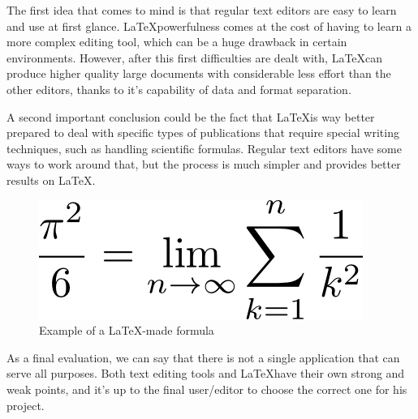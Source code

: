 The first idea that comes to mind is that regular text editors are easy to learn and use at first glance. \LaTeX powerfulness comes at the cost of having to learn a more complex editing tool, which can be a huge drawback in certain environments. However, after this first difficulties are dealt with, \LaTeX can produce higher quality large documents with considerable less effort than the other editors, thanks to it's capability of data and format separation.

A second important conclusion could be the fact that \LaTeX is way better prepared to deal with specific types of publications that require special writing techniques, such as handling scientific formulas. Regular text editors have some ways to work around that, but the process is much simpler and provides better results on \LaTeX.

\begin{figure}[H]
  \centering
  \includegraphics[scale=0.5]{Chapters/LaTeXFormulaEffect.png}
  \caption{ Example of a \LaTeX-made formula\footnotemark}
  \label{fig:LaTeX-formula-example}
\end{figure}


As a final evaluation, we can say that there is not a single application that can serve all purposes. Both text editing tools and \LaTeX have their own strong and weak points, and it's up to the final user/editor to choose the correct one for his project.

